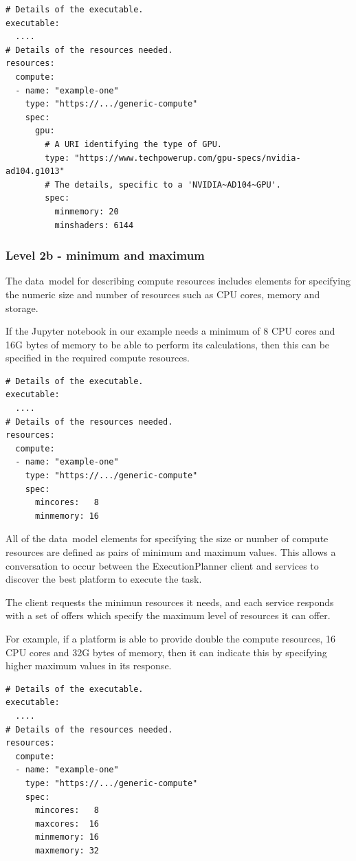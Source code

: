 \documentclass[11pt,a4paper]{ivoa}
\newcommand{\datamodel} {data~model}
\newcommand{\execplanner} {ExecutionPlanner}
\newcommand{\jupyternotebook} {Jupyter notebook}
\newcommand{\cpu} {CPU}
\begin{document}
\begin{lstlisting}[]
# Details of the executable.
executable:
  ....
# Details of the resources needed.
resources:
  compute:
  - name: "example-one"
    type: "https://.../generic-compute"
    spec:
      gpu:
        # A URI identifying the type of GPU.
        type: "https://www.techpowerup.com/gpu-specs/nvidia-ad104.g1013"
        # The details, specific to a 'NVIDIA~AD104~GPU'.
        spec:
          minmemory: 20
          minshaders: 6144
\end{lstlisting}

\subsubsection{Level 2b - minimum and maximum}
\label{minandmax}

The \datamodel{} for describing compute resources includes elements for specifying the numeric size
and number of resources such as \cpu{} cores, memory and storage.

If the \jupyternotebook{} in our example needs a minimum of 8 \cpu{} cores and 16G bytes of memory
to be able to perform its calculations, then this can be specified in the required compute resources.

\begin{lstlisting}[]
# Details of the executable.
executable:
  ....
# Details of the resources needed.
resources:
  compute:
  - name: "example-one"
    type: "https://.../generic-compute"
    spec:
      mincores:   8
      minmemory: 16
\end{lstlisting}

All of the \datamodel{} elements for specifying the size or number of compute resources are defined
as pairs of minimum and maximum values.
This allows a conversation to occur between the \execplanner{} client and services
to discover the best platform to execute the task.

The client requests the minimun resources it needs,
and each service responds with a set of offers which specify the maximum
level of resources it can offer.

For example, if a platform is able to provide double the compute resources,
16 \cpu{} cores and 32G bytes of memory,
then it can indicate this by specifying higher maximum values in its response.

\begin{lstlisting}[]
# Details of the executable.
executable:
  ....
# Details of the resources needed.
resources:
  compute:
  - name: "example-one"
    type: "https://.../generic-compute"
    spec:
      mincores:   8
      maxcores:  16
      minmemory: 16
      maxmemory: 32
\end{lstlisting}
\end{document}
